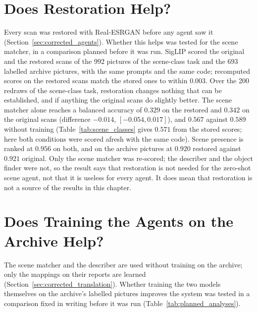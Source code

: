 \section{Does Restoration Help?}
\label{sec:restoration_ablation}

Every scan was restored with Real-ESRGAN before any agent saw it (Section~\ref{sec:corrected_agents}). Whether this helps was tested for the scene matcher, in a comparison planned before it was run. SigLIP scored the original and the restored scans of the $992$ pictures of the scene-class task and the $693$ labelled archive pictures, with the same prompts and the same code; recomputed scores on the restored scans match the stored ones to within $0.003$. Over the 200 redraws of the scene-class task, restoration changes nothing that can be established, and if anything the original scans do slightly better. The scene matcher alone reaches a balanced accuracy of $0.329$ on the restored and $0.342$ on the original scans (difference $-0.014$, $[-0.054, 0.017]$), and $0.567$ against $0.589$ without training (Table~\ref{tab:scene_classes} gives $0.571$ from the stored scores; here both conditions were scored afresh with the same code). Scene presence is ranked at $0.956$ on both, and on the archive pictures at $0.920$ restored against $0.921$ original. Only the scene matcher was re-scored; the describer and the object finder were not, so the result says that restoration is not needed for the zero-shot scene agent, not that it is useless for every agent. It does mean that restoration is not a source of the results in this chapter.

\section{Does Training the Agents on the Archive Help?}
\label{sec:finetune_agents}

The scene matcher and the describer are used without training on the archive; only the mappings on their reports are learned (Section~\ref{sec:corrected_translation}). Whether training the two models themselves on the archive's labelled pictures improves the system was tested in a comparison fixed in writing before it was run (Table~\ref{tab:planned_analyses}).

